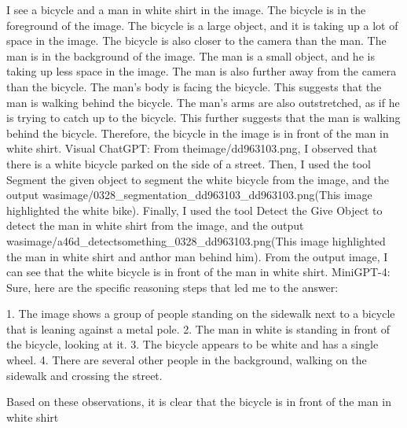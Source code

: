 \begin{enumerate}
    I see a bicycle and a man in white shirt in the image.
    The bicycle is in the foreground of the image. The bicycle is a large object, and it is taking up a lot of space in the image. The bicycle is also closer to the camera than the man.
    The man is in the background of the image. The man is a small object, and he is taking up less space in the image. The man is also further away from the camera than the bicycle.
    The man's body is facing the bicycle. This suggests that the man is walking behind the bicycle.
    The man's arms are also outstretched, as if he is trying to catch up to the bicycle. This further suggests that the man is walking behind the bicycle.
    Therefore, the bicycle in the image is in front of the man in white shirt.
    \subitem Visual ChatGPT: From theimage/dd963103.png, I observed that there is a white bicycle parked on the side of a street. Then, I used the tool Segment the given object to segment the white bicycle from the image, and the output wasimage/0328\_segmentation\_dd963103\_dd963103.png(This image highlighted the white bike). Finally, I used the tool Detect the Give Object to detect the man in white shirt from the image, and the output wasimage/a46d\_detect\-something\_0328\_dd963103.png(This image highlighted the man in white shirt and anthor man behind him). From the output image, I can see that the white bicycle is in front of the man in white shirt.
    \subitem MiniGPT-4: Sure, here are the specific reasoning steps that led me to the answer:

    1. The image shows a group of people standing on the sidewalk next to a bicycle that is leaning against a metal pole.
    2. The man in white is standing in front of the bicycle, looking at it.
    3. The bicycle appears to be white and has a single wheel.
    4. There are several other people in the background, walking on the sidewalk and crossing the street.
    
    Based on these observations, it is clear that the bicycle is in front of the man in white shirt
\end{enumerate}
